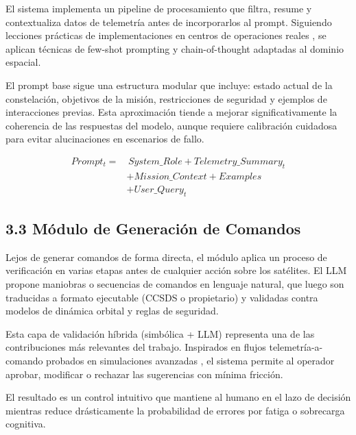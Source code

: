El sistema implementa un pipeline de procesamiento que filtra, resume y contextualiza datos de telemetría antes de incorporarlos al prompt. Siguiendo lecciones prácticas de implementaciones en centros de operaciones reales \cite{schefels2024evaluating}, se aplican técnicas de few-shot prompting y chain-of-thought adaptadas al dominio espacial. 

El prompt base sigue una estructura modular que incluye: estado actual de la constelación, objetivos de la misión, restricciones de seguridad y ejemplos de interacciones previas. Esta aproximación tiende a mejorar significativamente la coherencia de las respuestas del modelo, aunque requiere calibración cuidadosa para evitar alucinaciones en escenarios de fallo.

\begin{equation}
\begin{split}
Prompt_t = & \, System\_Role + Telemetry\_Summary_t \\
& + Mission\_Context + Examples \\
& + User\_Query_t
\end{split}
\label{eq:prompt_structure}
\end{equation}

\subsection{3.3 Módulo de Generación de Comandos}

Lejos de generar comandos de forma directa, el módulo aplica un proceso de verificación en varias etapas antes de cualquier acción sobre los satélites. El LLM propone maniobras o secuencias de comandos en lenguaje natural, que luego son traducidas a formato ejecutable (CCSDS o propietario) y validadas contra modelos de dinámica orbital y reglas de seguridad.

Esta capa de validación híbrida (simbólica + LLM) representa una de las contribuciones más relevantes del trabajo. Inspirados en flujos telemetría-a-comando probados en simulaciones avanzadas \cite{carrasco2025llm}, el sistema permite al operador aprobar, modificar o rechazar las sugerencias con mínima fricción. 

El resultado es un control intuitivo que mantiene al humano en el lazo de decisión mientras reduce drásticamente la probabilidad de errores por fatiga o sobrecarga cognitiva.